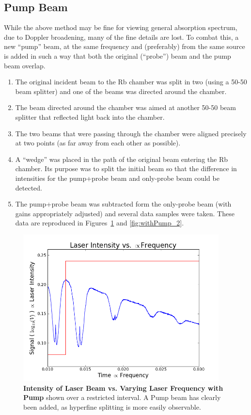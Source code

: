 \documentclass[paper=a4, fontsize=11pt]{scrartcl} %
\numberwithin{equation}{section}
\numberwithin{figure}{section}
\numberwithin{table}{section}
\begin{document}
\subsection{Pump Beam}
While the above method may be fine for viewing general absorption spectrum, due to Doppler broadening, many of the fine details are lost. To combat this, a new ``pump'' beam, at the same frequency and (preferably) from the same source is added in such a way that both the original (``probe'') beam and the pump beam overlap.

\begin{enumerate}
\item The original incident beam to the Rb chamber was split in two (using a 50-50 beam splitter) and one of the beams was directed around the chamber.
\item The beam directed around the chamber was aimed at another 50-50 beam splitter that reflected light back into the chamber.
\item The two beams that were passing through the chamber were aligned precisely at two points (as far away from each other as possible).
\item A ``wedge'' was placed in the path of the original beam entering the Rb chamber. Its purpose was to split the initial beam so that the difference in intensities for the pump+probe beam and only-probe beam could be detected.
\item The pump+probe beam was subtracted form the only-probe beam (with gains appropriately adjusted) and several data samples were taken. These data are reproduced in Figures~\ref{fig:withPump_1} and \ref{fig:withPump_2}.
\end{enumerate}


\begin{figure}[H] \begin{center}
  \includegraphics[height=80mm]{2-2-002-zoom.png}
  \caption{\textbf{Intensity of Laser Beam vs. Varying Laser Frequency with Pump} shown over a restricted interval. A Pump beam has clearly been added, as hyperfine splitting is more easily observable. }
  \label{fig:withPump_1}
\end{center} \end{figure}
\end{document}
